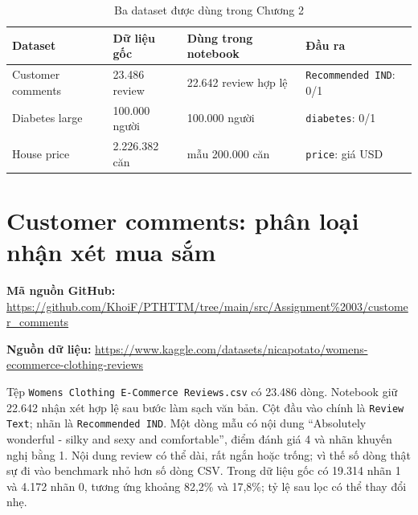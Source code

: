 \documentclass[12pt,a4paper]{report}
\newcommand{\datasetlink}[1]{\par\noindent\textbf{Nguồn dữ liệu: }\url{#1}\par}
\begin{document}
\begin{table}[htbp]\centering\caption{Ba dataset được dùng trong Chương 2}\label{tab:ml-overview}
\begin{tabularx}{\textwidth}{p{2.8cm}p{2.4cm}p{2.4cm}X}
\toprule\textbf{Dataset} & \textbf{Dữ liệu gốc} & \textbf{Dùng trong notebook} & \textbf{Đầu ra}\\\midrule
Customer comments & 23.486 review & 22.642 review hợp lệ & \texttt{Recommended IND}: 0/1\\
Diabetes large & 100.000 người & 100.000 người & \texttt{diabetes}: 0/1\\
House price & 2.226.382 căn & mẫu 200.000 căn & \texttt{price}: giá USD\\
\bottomrule\end{tabularx}\end{table}

\section{Customer comments: phân loại nhận xét mua sắm}
\noindent\textbf{Mã nguồn GitHub: }\url{https://github.com/KhoiF/PTHTTM/tree/main/src/Assignment%2003/customer_comments}\par
\datasetlink{https://www.kaggle.com/datasets/nicapotato/womens-ecommerce-clothing-reviews}
Tệp \texttt{Womens Clothing E-Commerce Reviews.csv} có 23.486 dòng. Notebook giữ 22.642 nhận xét hợp lệ sau bước làm sạch văn bản. Cột đầu vào chính là \texttt{Review Text}; nhãn là \texttt{Recommended IND}. Một dòng mẫu có nội dung ``Absolutely wonderful - silky and sexy and comfortable'', điểm đánh giá 4 và nhãn khuyến nghị bằng 1. Nội dung review có thể dài, rất ngắn hoặc trống; vì thế số dòng thật sự đi vào benchmark nhỏ hơn số dòng CSV. Trong dữ liệu gốc có 19.314 nhãn 1 và 4.172 nhãn 0, tương ứng khoảng 82,2\% và 17,8\%; tỷ lệ sau lọc có thể thay đổi nhẹ.
\end{document}
